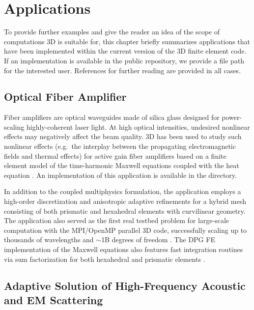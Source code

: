 %
%

\chapter{Applications}
\label{chap:applications}


To provide further examples and give the reader an idea of the scope of computations \hp3D is suitable for, this chapter briefly summarizes applications that have been implemented within the current version of the \hp3D finite element code. If an implementation is available in the public repository, we provide a file path for the interested user. References for further reading are provided in all cases.

\section{Optical Fiber Amplifier}
\label{sec:laser}

Fiber amplifiers are optical waveguides made of silica glass designed for power-scaling highly-coherent laser light. At high optical intensities, undesired nonlinear effects may negatively affect the beam quality. \hp3D has been used to study such nonlinear effects (e.g.~the interplay between the propagating electromagnetic fields and thermal effects) for active gain fiber amplifiers based on a finite element model of the time-harmonic Maxwell equations coupled with the heat equation \cite{henneking2021fiber,nagaraj2018raman}. An implementation of this application is available in the  directory. 

In addition to the coupled multiphysics formulation, the application employs a high-order discretization and anisotropic adaptive refinements \cite{henneking2021pollution} for a hybrid mesh consisting of both prismatic and hexahedral elements with curvilinear geometry. The application also served as the first real testbed problem for large-scale computation with the MPI/OpenMP parallel \hp3D code, successfully scaling up to thousands of wavelengths and $\sim$1B degrees of freedom \cite{henneking2021phd,henneking2022parallel}. The DPG FE implementation of the Maxwell equations also features fast integration routines via sum factorization for both hexahedral and prismatic elements \cite{mora2019fast,badger2020fast}.

\section{Adaptive Solution of High-Frequency Acoustic and EM Scattering}
\label{sec:adaptive}

